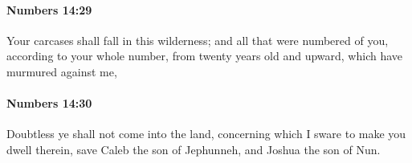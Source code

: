		\paragraph{Numbers 14:29} %
			\label{NUMBERS-14-29}

			Your carcases shall fall in this wilderness; and all that were numbered of you, according to your whole number, from twenty years old and upward, which have murmured against me,


		\paragraph{Numbers 14:30} %
			\label{NUMBERS-14-30}

			Doubtless ye shall not come into the land, concerning which I sware to make you dwell therein, save Caleb the son of Jephunneh, and Joshua the son of Nun.


